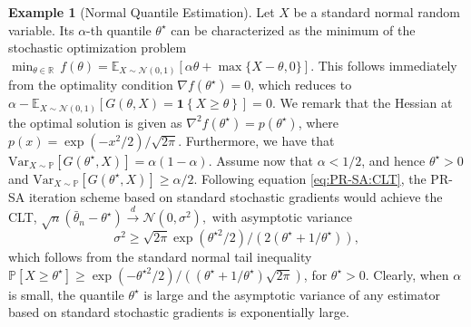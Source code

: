 \documentclass[11pt,a4paper]{article}
\theoremstyle{definition}
\newtheorem{example}[theorem]{Example}
\newcommand{\one}[1]{\mathbf 1 \left\{ #1 \right\}}
\renewcommand{\tfrac}[2]{#1/#2}
\begin{document}
\begin{example}[Normal Quantile Estimation]
\label{example:nqe}
Let $X$ be a standard normal random variable. Its $\alpha$-th quantile $\theta^\star$ can be characterized as the minimum of the stochastic optimization problem
\(
 \min_{\theta\in \mathbb R}\,f(\theta)=\mathbb E_{X\sim \mathcal N(0, 1)}\left[ \alpha \theta + \max\{X - \theta, 0\} \right].
\) 
This follows immediately from the optimality condition $\nabla f(\theta^\star)=0$, which reduces to $\alpha - \mathbb E_{X\sim \mathcal N(0, 1)}\left[ G(\theta, X) = \one{X \geq \theta} \right] = 0$.
We remark that the Hessian at the optimal solution is given as $\nabla^2 f(\theta^\star) = p(\theta^\star)$, where $p(x) = \tfrac{\exp(-x^2/2)}{\sqrt{2\pi}}$. 
Furthermore, we have that $\text{Var}_{X \sim \mathbb P}\left[G(\theta^\star,X)\right] = \alpha(1-\alpha)$. Assume now that $\alpha < 1/2$, and hence $\theta^\star>0$ and $\text{Var}_{X \sim \mathbb P}\left[G(\theta^\star,X)\right]\geq \alpha/2$.
Following equation \eqref{eq:PR-SA:CLT}, the PR-SA iteration scheme based on standard stochastic gradients would achieve the CLT,
$\sqrt{n}( \bar{\theta}_n - \theta^\star ) \overset{d}{\to} \mathcal N \left(0, \sigma^2  \right),$
with asymptotic variance $$\sigma^2 \geq \sqrt{2\pi}\exp(\theta^{\star 2}/2)/(2(\theta^\star + 1/\theta^\star)),$$ which follows from the standard normal tail inequality $\mathbb P[X\geq \theta^\star] \geq \exp(-\theta^{\star 2}/2)/((\theta^\star + 1/\theta^\star)\sqrt{2\pi})$, for $\theta^\star>0$. Clearly, when $\alpha$ is small, the quantile $\theta^\star$ is large and the asymptotic variance of any estimator based on standard stochastic gradients is exponentially large. 


\end{example}
\end{document}
